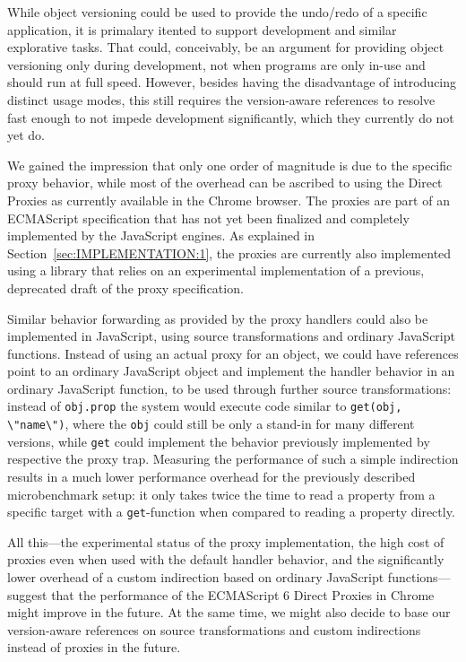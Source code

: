 While object versioning could be used to provide the undo/redo of a specific application, it is primalary itented to support development and similar explorative tasks.
That could, conceivably, be an argument for providing object versioning only during development, not when programs are only in-use and should run at full speed.
However, besides having the disadvantage of introducing distinct usage modes, this still requires the version-aware references to resolve fast enough to not impede development significantly, which they currently do not yet do.

We gained the impression that only one order of magnitude is due to the specific proxy behavior, while most of the overhead can be ascribed to using the Direct Proxies as currently available in the Chrome browser.
The proxies are part of an ECMAScript specification that has not yet been finalized and completely implemented by the JavaScript engines.
As explained in Section~\ref{sec:IMPLEMENTATION:1}, the proxies are currently also implemented using a library that relies on an experimental implementation of a previous, deprecated draft of the proxy specification.

Similar behavior forwarding as provided by the proxy handlers could also be implemented in JavaScript, using source transformations and ordinary JavaScript functions.
Instead of using an actual proxy for an object, we could have references point to an ordinary JavaScript object and implement the handler behavior in an ordinary JavaScript function, to be used through further source transformations: instead of \lstinline{obj.prop} the system would execute code similar to \lstinline{get(obj, \"name\")}, where the \lstinline{obj} could still be only a stand-in for many different versions, while \lstinline{get} could implement the behavior previously implemented by respective the proxy trap.
Measuring the performance of such a simple indirection results in a much lower performance overhead for the previously described microbenchmark setup:
it only takes twice the time to read a property from a specific target with a \lstinline{get}-function when compared to reading a property directly.

All this---the experimental status of the proxy implementation, the high cost of proxies even when used with the default handler behavior, and the significantly lower overhead of a custom indirection based on ordinary JavaScript functions---suggest that the performance of the ECMAScript 6 Direct Proxies in Chrome might improve in the future.
At the same time, we might also decide to base our version-aware references on source transformations and custom indirections instead of proxies in the future.


